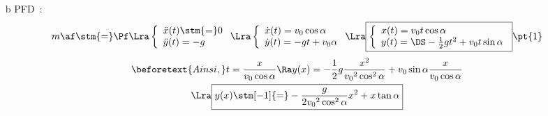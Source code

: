 \documentclass[a4paper, 10pt, final, garamond]{book}
\begin{document}
\begin{enumerate}[label=\sqenumi]
{\begin{minipage}[c]{0.39\linewidth}
\begin{center}
{				      }
				      \vspace{-15pt}
			      \end{center}
		      \end{minipage}
		      \begin{enumerate}[label=\sqenumi, start=6]
			      \item[b]{PFD}~:
			            \vspace{-15pt}
			            \[m\af \stm{=} \Pf
				            \Lra
				            \left\{
				            \begin{array}{l}
					            \ddot{x}(t) \stm{=} 0 \\
					            \ddot{y}(t) = -g
				            \end{array}
				            \right.
				            \Lra
				            \left\{
				            \begin{array}{l}
					            \dot{x}(t) = v_0\cos\alpha \\
					            \dot{y}(t) = -gt + v_0 \alpha
				            \end{array}
				            \right.
				            \Lra
				            \boxed{
					            \left\{
					            \begin{array}{l}
						            x(t) = v_0t\cos\alpha \\
						            y(t) = \DS -\frac{1}{2}gt^2 + v_0t\sin\alpha
					            \end{array}
					            \right.}
				            \pt{1}
			            \]
			            \begin{gather*}
				            \beforetext{Ainsi,}
				            t            = \frac{x}{v_0\cos\alpha}
				            \Ra
				            y(x)         = - \frac{1}{2}g \frac{x^2}{v_0{}^2\cos^2\alpha} +
				            v_0\sin\alpha \frac{x}{v_0\cos\alpha}
				            \\\Lra
				            \boxed{y(x) \stm[-1]{=} - \frac{g}{2v_0{}^2\cos^2\alpha}x^2 + x\tan\alpha}
			            \end{gather*}
		      \end{enumerate}
	      }
\end{enumerate}
\end{document}

